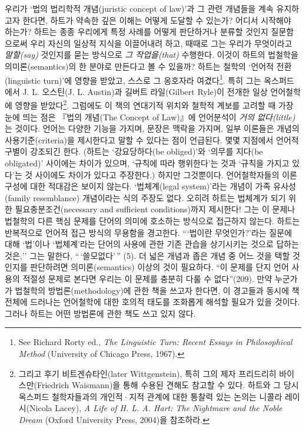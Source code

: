 \documentclass[12pt, oneside]{book}  %
\begin{document}
우리가 `법의 법리학적 개념(juristic concept of law)'과 그 관련 개념들을
계속 유지하고자 한다면, 하트가 약속한 깊은 이해는 어떻게 도달할 수
있는가? 어디서 시작해야 하는가? 하트는 종종 우리에게 특정 사례를 어떻게
판단하거나 분류할 것인지 질문함으로써 우리 자신의 일상적 지식을
이끌어내려 하고, 때때로 그는 우리가 무엇이라고 \emph{말할(say)} 것인지를
묻는 방식으로 \emph{그 작업을(that)} 수행한다. 이것이 하트의 법철학을
의미론(semantics)의 한 분야로 만든다고 볼 수 있을까? 하트는 철학의
`언어적 전환(linguistic turn)'에 영향을 받았고, 스스로 그 옹호자라
여겼다\footnote{See Richard Rorty ed., \emph{The Linguistic Turn: Recent
  Essays in Philosophical Method} (University of Chicago Press, 1967).}.
특히 그는 옥스퍼드에서 J. L. 오스틴(J. L. Austin)과 길버트 라일(Gilbert
Ryle)이 전개한 일상 언어철학에 영향을 받았다\footnote{그리고 후기
  비트겐슈타인(later Wittgenstein), 특히 그의 제자 프리드리히
  바이스만(Friedrich Waismann)을 통해 수용된 견해도 참고할 수 있다.
  하트와 그 당시 옥스퍼드 철학자들과의 개인적·지적 관계에 대한 통찰력
  있는 논의는 니콜라 레이시(Nicola Lacey), \emph{A Life of H. L. A.
  Hart: The Nightmare and the Noble Dream} (Oxford University Press,
  2004)을 참조하라.}. 그럼에도 이 책의 연대기적 위치와 철학적 계보를
고려할 때 가장 눈에 띄는 점은 『법의 개념(The Concept of Law)』에
언어분석이 \emph{거의 없다(little)}는 것이다. 언어는 다양한 기능을
가지며, 문장은 맥락을 가지며, 일부 이론들은 개념의 사용기준(criteria)을
제시한다고 말할 수 있다는 점이 언급된다. 몇몇 지점에서 언어적 구별이
강조되긴 한다. (하트는 `강요당하다(be obliged)'와 `의무를 지다(be
obligated)' 사이에는 차이가 있으며, `규칙에 따라 행위한다'는 것과
`규칙을 가지고 있다'는 것 사이에도 차이가 있다고 주장한다.) 하지만
그것뿐이다. 언어철학자들의 이론 구성에 대한 적대감은 보이지 않는다.
`법체계(legal system)'라는 개념이 가족 유사성(family resemblance)
개념이라는 식의 주장도 없다. 오히려 하트는 법체계가 되기 위한
필요충분조건(necessary and sufficient conditions)까지 제시한다! 그는 이
문제나 법철학의 다른 핵심 문제를 단어의 의미에 호소하는 방식으로
접근하지 않는다. 하트는 반복적으로 언어적 접근 방식의 무용함을 경고한다.
```법이란 무엇인가?'라는 질문에 대해 `법'이나 `법체계'라는 단어의 사용에
관한 기존 관습을 상기시키는 것으로 답하는 것은,'' 그는 말한다,
``\,`쓸모없다'\,'' (5). 더 넓은 개념과 좁은 개념 중 어느 것을 택할
것인지를 판단하려면 의미론(semantics) 이상의 것이 필요하다. ``이 문제를
단지 언어 사용의 적절성 문제로 본다면 우리는 이 문제를 충분히 다룰 수
없다''(209). 만약 누군가가 법철학의 방법론(methodology)에 관한 책을
쓰고자 한다면, 이 경고들과 동시에 책 전체에 드러나는 언어철학에 대한
호의적 태도를 조화롭게 해석할 필요가 있을 것이다. 그러나 하트는 어떤
방법론에 관한 책도 쓰고 있지 않다.
\end{document}
